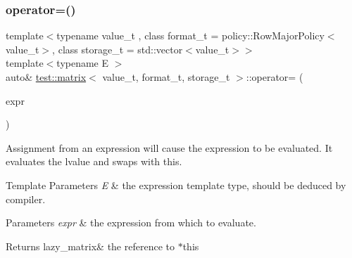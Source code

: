 \subsubsection{\texorpdfstring{operator=()}{operator=()}\hspace{0.1cm}{\footnotesize\ttfamily [1/4]}}
{\footnotesize\ttfamily template$<$typename value\+\_\+t , class format\+\_\+t  = policy\+::\+Row\+Major\+Policy$<$value\+\_\+t$>$, class storage\+\_\+t  = std\+::vector$<$value\+\_\+t$>$$>$ \\
template$<$typename E $>$ \\
auto\& \mbox{\hyperlink{classtest_1_1matrix}{test\+::matrix}}$<$ value\+\_\+t, format\+\_\+t, storage\+\_\+t $>$\+::operator= (\begin{DoxyParamCaption}\item[{\mbox{\hyperlink{classtest_1_1expression}{expression}}$<$ E $>$ \&\&}]{expr }\end{DoxyParamCaption})\hspace{0.3cm}{\ttfamily [inline]}}



Assignment from an expression will cause the expression to be evaluated. It evaluates the lvalue and swaps with this. 


\begin{DoxyTemplParams}{Template Parameters}
{\em E} & the expression template type, should be deduced by compiler. \\
\hline
\end{DoxyTemplParams}

\begin{DoxyParams}{Parameters}
{\em expr} & the expression from which to evaluate. \\
\hline
\end{DoxyParams}
\begin{DoxyReturn}{Returns}
lazy\+\_\+matrix\& the reference to $\ast$this 
\end{DoxyReturn}
\mbox{\label{classtest_1_1matrix_ac1ee57e3db511b178d37cff278d9eefd}} 
